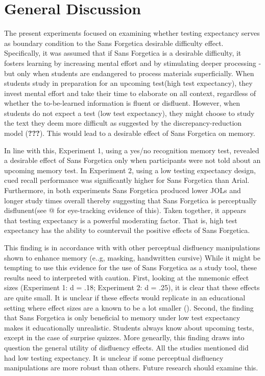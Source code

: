 \documentclass[
  english,
  jou]{apa6}
\begin{document}
\hypertarget{general-discussion}{%
\section{General Discussion}\label{general-discussion}}

The present experiments focused on examining whether testing expectancy serves as boundary condition to the Sans Forgetica desirable difficulty effect. Specifically, it was assumed that if Sans Forgetica is a desirable difficulty, it fosters learning by increasing mental effort and by stimulating deeper processing - but only when students are endangered to process materials superficially. When students study in preparation for an upcoming test(high test expectancy), they invest mental effort and take their time to elaborate on all context, regardless of whether the to-be-learned information is fluent or disfluent. However, when students do not expect a test (low test expectancy), they might choose to study the text they deem more difficult as suggested by the discrepancy-reduction model ({\textbf{???}}). This would lead to a desirable effect of Sans Forgetica on memory.

In line with this, Experiment 1, using a yes/no recognition memory test, revealed a desirable effect of Sans Forgetica only when participants were not told about an upcoming memory test. In Experiment 2, using a low testing expectancy design, cued recall performance was significantly higher for Sans Forgetica than Arial. Furthermore, in both experiments Sans Forgetica produced lower JOLs and longer study times overall thereby suggesting that Sans Forgetica is perceptually disflunent(see @ for eye-tracking evidence of this). Taken together, it appears that testing expectancy is a powerful moderating factor. That is, high test expectancy has the ability to countervail the positive effects of Sans Forgetica.

This finding is in accordance with with other perceptual disfluency manipulations shown to enhance memory (e..g, masking, handwritten cursive) While it might be tempting to use this evidence for the use of Sans Forgetica as a study tool, these results need to interpreted with caution. First, looking at the mnemonic effect sizes (Experiment 1: d = .18; Experiment 2: d = .25), it is clear that these effects are quite small. It is unclear if these effects would replicate in an educational setting where effect sizes are a known to be a lot smaller (). Second, the finding that Sans Forgetica is only beneficial to memory under low test expectancy makes it educationally unrealistic. Students always know about upcoming tests, except in the case of surprise quizzes. More genearlly, this finding draws into question the general utility of disfluency effects. All the studies mentioned did had low testing expectancy. It is unclear if some perceptual disfluency manipulations are more robust than others. Future research should examine this.
\end{document}
